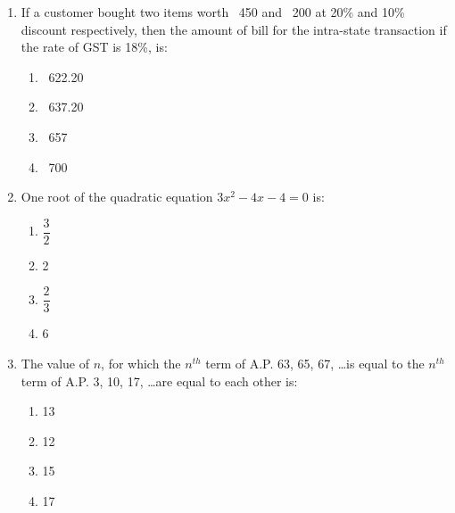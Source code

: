 \begin{enumerate}[label=(\roman*)]
    \newpage
    \item If a customer bought two items worth \rupee~450 and \rupee~200
        at 20\% and 10\% discount respectively, then the amount of bill
        for the intra-state transaction if the rate of GST is 18\%, is:

        \begin{multicols}{2}
        \begin{enumerate}[label=(\alph*)]
            \item \rupee~622.20
            \item \rupee~637.20
            \item \rupee~657
            \item \rupee~700
        \end{enumerate}
        \end{multicols}

    \item One root of the quadratic equation $3x^2 - 4x - 4 = 0$ is:

        \begin{multicols}{2}
        \begin{enumerate}[label=(\alph*)]
            \item $\dfrac32$
            \item 2
            \item $\dfrac23$
            \item 6
        \end{enumerate}
        \end{multicols}

    \item The value of $n$, for which the $n^{th}$ term of A.P. 
        63, 65, 67, \dots is equal to the $n^{th}$ term of A.P. 
        3, 10, 17, \dots are equal to each other is:

        \begin{multicols}{2}
        \begin{enumerate}[label=(\alph*)]
            \item 13
            \item 12
            \item 15
            \item 17
        \end{enumerate}
        \end{multicols}


\end{enumerate}
